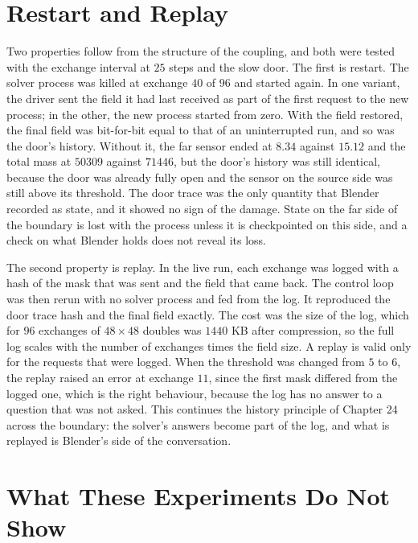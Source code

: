 \section{Restart and Replay}

Two properties follow from the structure of the coupling, and both were tested with the exchange interval at $25$ steps and the slow door. The first is restart. The solver process was killed at exchange $40$ of $96$ and started again. In one variant, the driver sent the field it had last received as part of the first request to the new process; in the other, the new process started from zero. With the field restored, the final field was bit-for-bit equal to that of an uninterrupted run, and so was the door's history. Without it, the far sensor ended at $8.34$ against $15.12$ and the total mass at $50309$ against $71446$, but the door's history was still identical, because the door was already fully open and the sensor on the source side was still above its threshold. The door trace was the only quantity that Blender recorded as state, and it showed no sign of the damage. State on the far side of the boundary is lost with the process unless it is checkpointed on this side, and a check on what Blender holds does not reveal its loss.

The second property is replay. In the live run, each exchange was logged with a hash of the mask that was sent and the field that came back. The control loop was then rerun with no solver process and fed from the log. It reproduced the door trace hash and the final field exactly. The cost was the size of the log, which for $96$ exchanges of $48\times 48$ doubles was $1440$ KB after compression, so the full log scales with the number of exchanges times the field size. A replay is valid only for the requests that were logged. When the threshold was changed from $5$ to $6$, the replay raised an error at exchange $11$, since the first mask differed from the logged one, which is the right behaviour, because the log has no answer to a question that was not asked. This continues the history principle of Chapter 24 across the boundary: the solver's answers become part of the log, and what is replayed is Blender's side of the conversation.

\section{What These Experiments Do Not Show}

